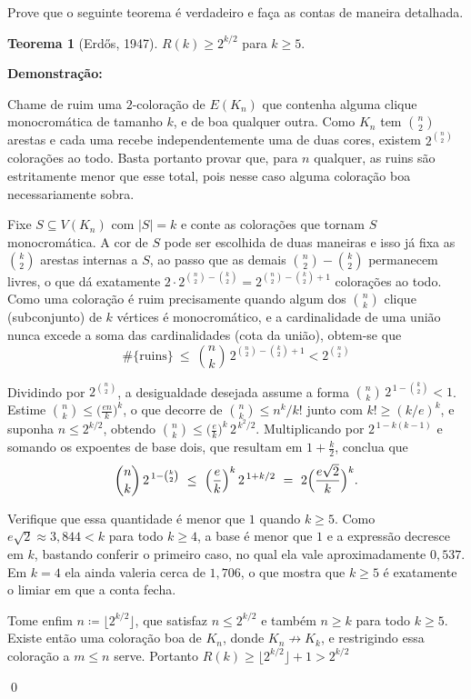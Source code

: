 \documentclass[12pt]{article}
\newenvironment{problem}[2][Exercício]{\begin{trivlist}
\item[\hskip \labelsep {\bfseries #1}\hskip \labelsep {\bfseries #2.}]}{\end{trivlist}}
\newenvironment{sol}
    {\textbf{Demonstração:}\emph{}
    }
    {
    \qed
    }
\begin{document}
\begin{problem}{2}
    Prove que o seguinte teorema é verdadeiro e faça as contas de maneira detalhada.
    
    \textbf{Teorema 1} (Erdős, 1947). $R(k) \ge 2^{k/2}$ para $k \ge 5$.
\end{problem}
\begin{sol}
    Chame de ruim uma $2$-coloração de $E(K_n)$ que contenha alguma clique monocromática de tamanho $k$, e de boa qualquer outra. Como $K_n$ tem $\binom{n}{2}$ arestas e cada uma recebe independentemente uma de duas cores, existem $2^{\binom{n}{2}}$ colorações ao todo. Basta portanto provar que, para $n$ qualquer, as ruins são estritamente menor que esse total, pois nesse caso alguma coloração boa necessariamente sobra.

    Fixe $S \subseteq V(K_n)$ com $|S| = k$ e conte as colorações que tornam $S$ monocromática. A cor de $S$ pode ser escolhida de duas maneiras e isso já fixa as $\binom{k}{2}$ arestas internas a $S$, ao passo que as demais $\binom{n}{2} - \binom{k}{2}$ permanecem livres, o que dá exatamente $2\cdot2^{\binom{n}{2} - \binom{k}{2}} = 2^{\binom{n}{2} - \binom{k}{2} + 1}$ colorações ao todo. Como uma coloração é ruim precisamente quando algum dos $\binom{n}{k}$ clique (subconjunto) de $k$ vértices é monocromático, e a cardinalidade de uma união nunca excede a soma das cardinalidades (cota da união), obtem-se que
    \[
        \#\{\text{ruins}\}\ \le\ \binom{n}{k}\,2^{\binom{n}{2} - \binom{k}{2}+1} < 2^{\binom{n}{2}}
    \]

    Dividindo por $2^{\binom{n}{2}}$, a desigualdade desejada assume a forma $\binom{n}{k}\,2^{\,1 -\binom{k}{2}} < 1$.
    \newpage
    Estime $\binom{n}{k}\le\bigl(\tfrac{en}{k}\bigr)^k$, o que decorre de $\binom{n}{k} \le n^k/k!$ junto com $k!\ge(k/e)^k$, e suponha $n \le 2^{k/2}$, obtendo $\binom{n}{k} \le \bigl(\tfrac{e}{k}\bigr)^k\,2^{\,k^2/2}$. Multiplicando por $2^{\,1-k(k-1)}$ e somando os expoentes de base dois, que resultam em $1+\tfrac{k}{2}$, conclua que
    \[
        \binom{n}{k}\,2^{\,1-\binom{k}{2}}\ \le\ \Bigl( \frac{e}{k} \Bigr)^k \, 2^{\, 1+k/2} \ = \ 2\Bigl(\frac{e\sqrt{2}}{k}\Bigr)^k.
    \]

    Verifique que essa quantidade é menor que $1$ quando $k \ge 5$. Como $e\sqrt{2} \approx 3{,}844 < k$ para todo $k \ge 4$, a base é menor que $1$ e a expressão decresce em $k$, bastando conferir o primeiro caso, no qual ela vale aproximadamente $0{,}537$. Em $k=4$ ela ainda valeria cerca de $1{,}706$, o que mostra que $k \ge 5$ é exatamente o limiar em que a conta fecha.

    Tome enfim $n \coloneqq \lfloor 2^{k/2} \rfloor$, que satisfaz $n \le 2^{k/2}$ e também $n \ge k$ para todo $k \ge 5$. Existe então uma coloração boa de $K_n$, donde $K_n \not\to K_k$, e restrigindo essa coloração a $m \le n$ serve. Portanto $R(k) \ge \lfloor 2^{k/2}\rfloor+1 > 2^{k/2}$
\end{sol}
\end{document}
